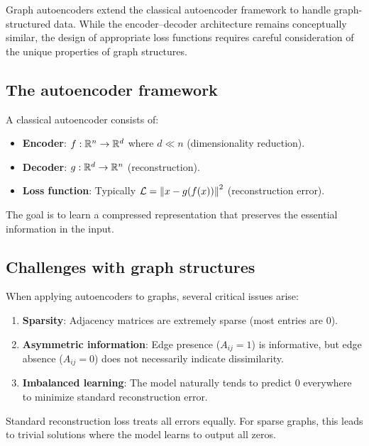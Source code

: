 \begin{notechapter}
Graph autoencoders extend the classical autoencoder framework to handle graph-structured data. While the encoder--decoder architecture remains conceptually similar, the design of appropriate loss functions requires careful consideration of the unique properties of graph structures.

\subsection{The autoencoder framework}

A classical autoencoder consists of:
\begin{itemize}
    \item \textbf{Encoder}: $f: \mathbb{R}^n \to \mathbb{R}^d$ where $d \ll n$ (dimensionality reduction).
    \item \textbf{Decoder}: $g: \mathbb{R}^d \to \mathbb{R}^n$ (reconstruction).
    \item \textbf{Loss function}: Typically $\mathcal{L} = \left\|x - g(f(x))\right\|^2$ (reconstruction error).
\end{itemize}

The goal is to learn a compressed representation that preserves the essential information in the input.

\subsection{Challenges with graph structures}

When applying autoencoders to graphs, several critical issues arise:

\begin{enumerate}
    \item \textbf{Sparsity}: Adjacency matrices are extremely sparse (most entries are 0).
    \item \textbf{Asymmetric information}: Edge presence ($A_{ij} = 1$) is informative, but edge absence ($A_{ij} = 0$) does not necessarily indicate dissimilarity.
    \item \textbf{Imbalanced learning}: The model naturally tends to predict 0 everywhere to minimize standard reconstruction error.
\end{enumerate}

\begin{keyidea}
Standard reconstruction loss treats all errors equally. For sparse graphs, this leads to trivial solutions where the model learns to output all zeros.
\end{keyidea}


\end{notechapter}
